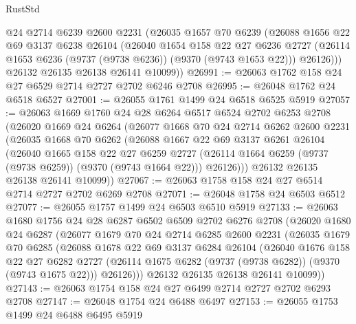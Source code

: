\begin{lexlean}{RustStd}
\begin{coremodule}
{\begin{coremodule}
{{{{{{{{{{{{{{{{{{{{{{{{{{{{{{{{{{{{{{{        @24
        @2714
        @6239
        @2600
        @2231
        (@26035
          @1657
          @70
          @6239
          (@26088
            @1656
            @22
            @69
            @3137
            @6238
            @26104
            (@26040
              @1654
              @158
              @22
              @27
              @6236
              @2727
              (@26114 @1653 @6236 (@9737 (@9738 @6236)) (@9370 (@9743 @1653 @22)))
              @26126)))
        @26132
        @26135
        @26138
        @26141
        @10099))
@26991 := @26063 @1762 @158 @24 @27 @6529 @2714 @2727 @2702 @6246 @2708
@26995 := @26048 @1762 @24 @6518 @6527
@27001 := @26055 @1761 @1499 @24 @6518 @6525 @5919
@27057 := @26063
    @1669
    @1760
    @24
    @28
    @6264
    @6517
    @6524
    @2702
    @6253
    @2708
    (@26020
      @1669
      @24
      @6264
      (@26077
        @1668
        @70
        @24
        @2714
        @6262
        @2600
        @2231
        (@26035
          @1668
          @70
          @6262
          (@26088
            @1667
            @22
            @69
            @3137
            @6261
            @26104
            (@26040
              @1665
              @158
              @22
              @27
              @6259
              @2727
              (@26114 @1664 @6259 (@9737 (@9738 @6259)) (@9370 (@9743 @1664 @22)))
              @26126)))
        @26132
        @26135
        @26138
        @26141
        @10099))
@27067 := @26063 @1758 @158 @24 @27 @6514 @2714 @2727 @2702 @6269 @2708
@27071 := @26048 @1758 @24 @6503 @6512
@27077 := @26055 @1757 @1499 @24 @6503 @6510 @5919
@27133 := @26063
    @1680
    @1756
    @24
    @28
    @6287
    @6502
    @6509
    @2702
    @6276
    @2708
    (@26020
      @1680
      @24
      @6287
      (@26077
        @1679
        @70
        @24
        @2714
        @6285
        @2600
        @2231
        (@26035
          @1679
          @70
          @6285
          (@26088
            @1678
            @22
            @69
            @3137
            @6284
            @26104
            (@26040
              @1676
              @158
              @22
              @27
              @6282
              @2727
              (@26114 @1675 @6282 (@9737 (@9738 @6282)) (@9370 (@9743 @1675 @22)))
              @26126)))
        @26132
        @26135
        @26138
        @26141
        @10099))
@27143 := @26063 @1754 @158 @24 @27 @6499 @2714 @2727 @2702 @6293 @2708
@27147 := @26048 @1754 @24 @6488 @6497
@27153 := @26055 @1753 @1499 @24 @6488 @6495 @5919
}}}}}}}}}}}}}}}}}}}}}}}}}}}}}}}}}}}}}}}
\end{coremodule}}
\end{coremodule}
\end{lexlean}
